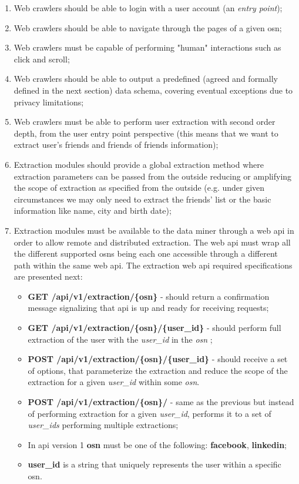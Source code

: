 \begin{enumerate}
    \item Web crawlers should be able to login with a user account (an \textit{entry point});
    \item Web crawlers should be able to navigate through the pages of a given \gls{osn};
    \item Web crawlers must be capable of performing "human" interactions such as click and scroll;
    \item Web crawlers should be able to output a predefined (agreed and formally defined in the next section) data schema, covering eventual
    exceptions due to privacy limitations;
    \item Web crawlers must be able to perform user extraction with second order depth, from the user entry point perspective (this means that we want to extract user's friends and friends of friends information);
    \item Extraction modules should provide a global extraction method where extraction parameters can be passed from the outside reducing or amplifying the scope of extraction as specified from the outside (e.g. under given circumstances we may only need to extract the friends' list or the basic information like name, city and birth date);
    \item Extraction modules must be available to the data miner through a web \gls{api} in order to allow remote and distributed extraction. The web \gls{api} must wrap all the different supported \glspl{osn} being each one accessible through a different path within the same web \gls{api}. The extraction web \gls{api} required specifications are presented next:
    \begin{itemize}
        \item \textbf{GET /api/v1/extraction/\{osn\}} - should return a confirmation message signalizing that \gls{api} is up and ready for receiving requests;
        \item \textbf{GET /api/v1/extraction/\{osn\}/\{user\_id\}} - should perform full extraction of the user with the \textit{user\_id} in the \textit{osn} ;
        \item \textbf{POST /api/v1/extraction/\{osn\}/\{user\_id\}} - should receive a set of options, that parameterize the extraction and reduce the scope of the extraction for a given \textit{user\_id} within some \textit{osn}.
        \item \textbf{POST /api/v1/extraction/\{osn\}/} - same as the previous but instead of performing extraction for a given \textit{user\_id}, performs it to a set of \textit{user\_ids} performing multiple extractions;
        \item In \gls{api} version 1 \textbf{osn} must be one of the following: \textbf{facebook}, \textbf{linkedin};
        \item \textbf{user\_id} is a string that uniquely represents the user within a specific \gls{osn}.
    \end{itemize}
\end{enumerate}

